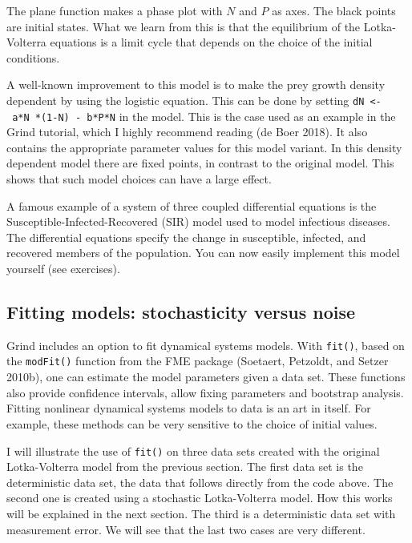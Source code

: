 \documentclass[
  a4paper,
  DIV=11,
  numbers=noendperiod,
  oneside]{scrreprt}
\begin{document}
The plane function makes a phase plot with \(N\) and \(P\) as axes. The
black points are initial states. What we learn from this is that the
equilibrium of the Lotka-Volterra equations is a limit cycle that
depends on the choice of the initial conditions.

A well-known improvement to this model is to make the prey growth
density dependent by using the logistic equation. This can be done by
setting \texttt{dN\ \textless{}-\ a*N\ *(1-N)\ -\ b*P*N} in the model.
This is the case used as an example in the Grind tutorial, which I
highly recommend reading (de Boer 2018). It also contains the
appropriate parameter values for this model variant. In this density
dependent model there are fixed points, in contrast to the original
model. This shows that such model choices can have a large effect.

A famous example of a system of three coupled differential equations is
the Susceptible-Infected-Recovered (SIR) model used to model infectious
diseases. The differential equations specify the change in susceptible,
infected, and recovered members of the population. You can now easily
implement this model yourself (see exercises).

\hypertarget{sec-Fitting-models-stochasticity-versus-noise}{%
\subsection{Fitting models: stochasticity versus
noise}\label{sec-Fitting-models-stochasticity-versus-noise}}

Grind includes an option to fit dynamical systems models. With
\texttt{fit()}, based on the \texttt{modFit()} function from the FME
package (Soetaert, Petzoldt, and Setzer 2010b), one can estimate the
model parameters given a data set. These functions also provide
confidence intervals, allow fixing parameters and bootstrap analysis.
Fitting nonlinear dynamical systems models to data is an art in itself.
For example, these methods can be very sensitive to the choice of
initial values.

I will illustrate the use of \texttt{fit()} on three data sets created
with the original Lotka-Volterra model from the previous section. The
first data set is the deterministic data set, the data that follows
directly from the code above. The second one is created using a
stochastic Lotka-Volterra model. How this works will be explained in the
next section. The third is a deterministic data set with measurement
error. We will see that the last two cases are very different.
\end{document}

